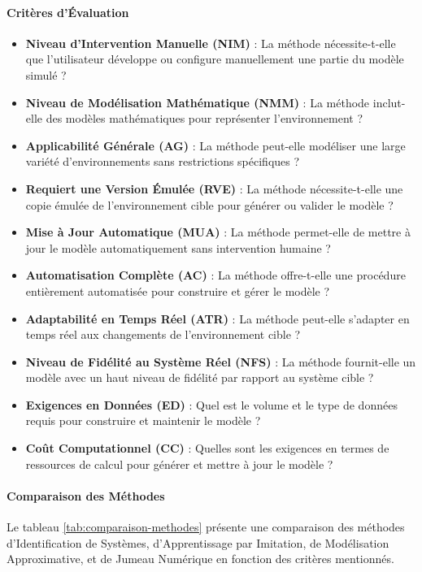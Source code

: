 \documentclass[sigconf,anonymous]{aamas}
\begin{document}
\paragraph{Critères d'Évaluation}

\begin{itemize}
    \item \textbf{Niveau d'Intervention Manuelle (NIM)} : La méthode nécessite-t-elle que l'utilisateur développe ou configure manuellement une partie du modèle simulé ?
    \item \textbf{Niveau de Modélisation Mathématique (NMM)} : La méthode inclut-elle des modèles mathématiques pour représenter l'environnement ?
    \item \textbf{Applicabilité Générale (AG)} : La méthode peut-elle modéliser une large variété d'environnements sans restrictions spécifiques ?
    \item \textbf{Requiert une Version Émulée (RVE)} : La méthode nécessite-t-elle une copie émulée de l'environnement cible pour générer ou valider le modèle ?
    \item \textbf{Mise à Jour Automatique (MUA)} : La méthode permet-elle de mettre à jour le modèle automatiquement sans intervention humaine ?
    \item \textbf{Automatisation Complète (AC)} : La méthode offre-t-elle une procédure entièrement automatisée pour construire et gérer le modèle ?
    \item \textbf{Adaptabilité en Temps Réel (ATR)} : La méthode peut-elle s'adapter en temps réel aux changements de l'environnement cible ?
    \item \textbf{Niveau de Fidélité au Système Réel (NFS)} : La méthode fournit-elle un modèle avec un haut niveau de fidélité par rapport au système cible ?
    \item \textbf{Exigences en Données (ED)} : Quel est le volume et le type de données requis pour construire et maintenir le modèle ?
    \item \textbf{Coût Computationnel (CC)} : Quelles sont les exigences en termes de ressources de calcul pour générer et mettre à jour le modèle ?
\end{itemize}

\paragraph{Comparaison des Méthodes}

Le tableau \ref{tab:comparaison-methodes} présente une comparaison des méthodes d'Identification de Systèmes, d'Apprentissage par Imitation, de Modélisation Approximative, et de Jumeau Numérique en fonction des critères mentionnés.
\end{document}
